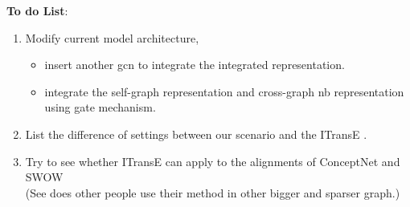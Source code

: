 \noindent \textbf{To do List}: 
\begin{enumerate}
    \item  Modify current model architecture, 
        \begin{itemize}
            \item insert another gcn to integrate the integrated representation.
            \item integrate the self-graph representation and cross-graph nb representation using gate mechanism. 
        \end{itemize}
        
    \item List the difference of settings between our scenario and the ITransE \citep{Zhu2017IterativeEA}. 
    \item Try to see whether ITransE can apply to the alignments of ConceptNet and SWOW 
    \\(See does other people use their method in other bigger and sparser graph.)
\end{enumerate}






